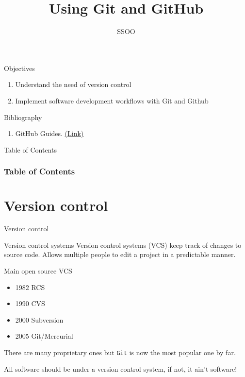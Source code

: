 \documentclass[10pt,compress]{beamer} %
\title{Using Git and GitHub}
\author{SSOO}
\institute{University of Alcalá}
\date{}
\begin{document}
{\titlepageBlue
    \begin{frame}
        \titlepage
    \end{frame}
}

\begin{frame}[plain]{}
   \begin{block}{Objectives}
      \begin{enumerate}
         \item Understand the need of version control
         \item Implement software development workflows with Git and Github
      \end{enumerate}
   \end{block}

   \begin{block}{Bibliography}
      \begin{enumerate}
          \item GitHub Guides. \href{https://guides.github.com/}{(Link)}
      \end{enumerate} 
   \end{block}
\end{frame}

{
\begin{frame}[shrink]{Table of Contents}
 \frametitle{Table of Contents}
 \tableofcontents
\end{frame}
}


\section{Version control}


\begin{frame}{Version control}

\begin{block}{Version control systems}
Version control systems (VCS) keep track of changes to source code.
Allows multiple people to edit a project in a predictable manner.
\end{block}

Main open source VCS 
\begin{itemize}
 \item 1982 RCS
 \item 1990 CVS
 \item 2000 Subversion
 \item 2005 Git/Mercurial
\end{itemize}

There are many proprietary ones but \texttt{Git} is now the most popular one by far.

All software should be under a version control system, if not, it ain't software!

\end{frame}
\end{document}
